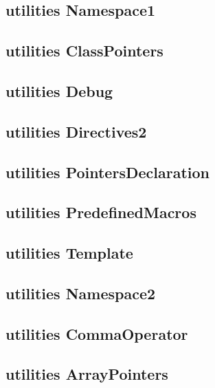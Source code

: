 \subsection{utilities Namespace1}
\raggedbottom
\hrulefill
\subsection{utilities ClassPointers}
\raggedbottom
\hrulefill
\subsection{utilities Debug}
\raggedbottom
\hrulefill
\subsection{utilities Directives2}
\raggedbottom
\hrulefill
\subsection{utilities PointersDeclaration}
\raggedbottom
\hrulefill
\subsection{utilities PredefinedMacros}
\raggedbottom
\hrulefill
\subsection{utilities Template}
\raggedbottom
\hrulefill
\subsection{utilities Namespace2}
\raggedbottom
\hrulefill
\subsection{utilities CommaOperator}
\raggedbottom
\hrulefill
\subsection{utilities ArrayPointers}
\raggedbottom
\hrulefill
